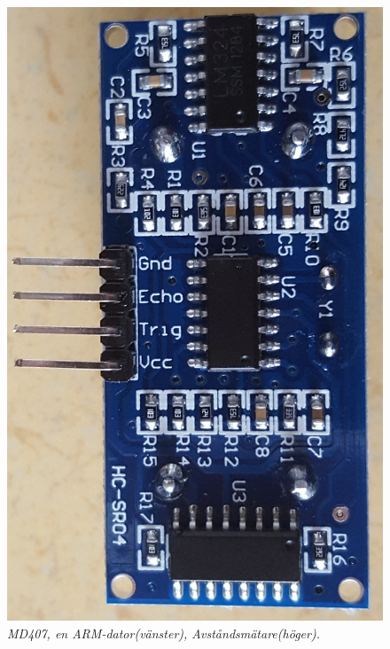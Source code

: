 \documentclass[a4paper]{article}
\begin{document}
\begin{figure}[H]
\includegraphics[scale=0.07]{DistanceMeasure.jpg}
\centering
\caption{\it MD407, en ARM-dator(vänster), Avståndsmätare(höger).}
\end{figure} 

\end{document}
